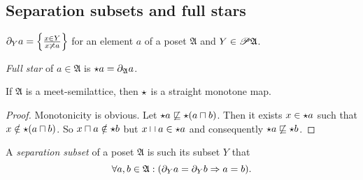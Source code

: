 \subsection{\label{sep-and-full}Separation subsets and full stars}
\begin{defn}
$\partial_{Y}a=\left\{ \frac{x\in Y}{x\not\asymp a}\right\}$ for an element $a$
of a poset $\mathfrak{A}$ and $Y\in\mathscr{P}\mathfrak{A}$.
\end{defn}

\begin{defn}
\emph{Full star} of $a\in\mathfrak{A}$ is $\star a=\partial_{\mathfrak{A}}a$.\end{defn}
\begin{prop}
If $\mathfrak{A}$ is a meet-semilattice, then $\star$ is a straight
monotone map.\end{prop}
\begin{proof}
Monotonicity is obvious. Let $\star a\not\sqsubseteq\star(a\sqcap b)$.
Then it exists $x\in\star a$ such that $x\notin\star(a\sqcap b)$.
So $x\sqcap a\notin\star b$ but $x\sqcap a\in\star a$ and
consequently $\star a\not\sqsubseteq\star b$.\end{proof}
\begin{defn}
A \emph{separation subset} of a poset $\mathfrak{A}$
is such its subset $Y$ that
\[
\forall a,b\in\mathfrak{A}:(\partial_{Y}a=\partial_{Y}b\Rightarrow a=b).
\]

\end{defn}

